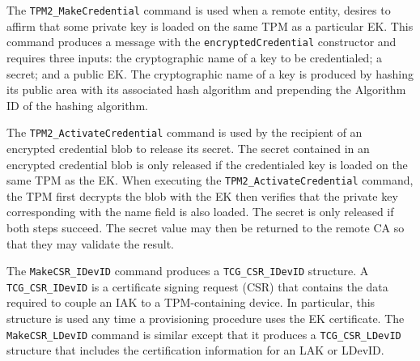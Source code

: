 \documentclass[runningheads]{llncs}
\begin{document}

The \verb|TPM2_MakeCredential| command is used when a remote entity,
desires to affirm that some private key is loaded on the same TPM as a
particular EK. This command produces a message with the
\verb|encryptedCredential| constructor and requires three inputs: the
cryptographic name of a key to be credentialed; a secret; and a public
EK. The cryptographic name of a key is produced by hashing its public
area with its associated hash algorithm and prepending the Algorithm
ID of the hashing algorithm.

The \verb|TPM2_ActivateCredential| command is used by the recipient of
an encrypted credential blob to release its secret.  The secret
contained in an encrypted credential blob is only released if the
credentialed key is loaded on the same TPM as the EK.  When executing
the \verb|TPM2_ActivateCredential| command, the TPM first decrypts the
blob with the EK then verifies that the private key corresponding with
the name field is also loaded. The secret is only released if both
steps succeed. The secret value may then be returned to the remote CA
so that they may validate the result.

The \verb|MakeCSR_IDevID| command produces a \verb|TCG_CSR_IDevID|
structure.  A \verb|TCG_CSR_IDevID| is a certificate signing request
(CSR) that contains the data required to couple an IAK to a
TPM-containing device.  In particular, this structure is used any time
a provisioning procedure uses the EK certificate.  The
\verb|MakeCSR_LDevID| command is similar except that it produces a
\verb|TCG_CSR_LDevID| structure that includes the certification
information for an LAK or LDevID.

\end{document}
